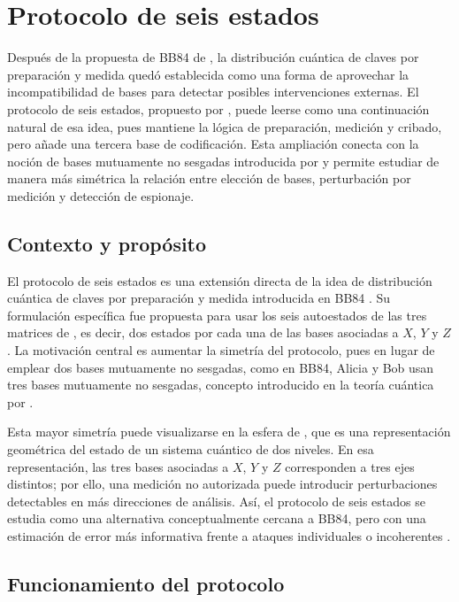 \section{Protocolo de seis estados}

Después de la propuesta de BB84 de \cite{bennett1984}, la distribución cuántica de claves por preparación y medida quedó establecida como una forma de aprovechar la incompatibilidad de bases para detectar posibles intervenciones externas. El protocolo de seis estados, propuesto por \cite{bruss1998}, puede leerse como una continuación natural de esa idea, pues mantiene la lógica de preparación, medición y cribado, pero añade una tercera base de codificación. Esta ampliación conecta con la noción de bases mutuamente no sesgadas introducida por \cite{schwinger1960} y permite estudiar de manera más simétrica la relación entre elección de bases, perturbación por medición y detección de espionaje.

\subsection{Contexto y propósito}

El protocolo de seis estados es una extensión directa de la idea de distribución cuántica de claves por preparación y medida introducida en BB84 \citep{bennett1984}. Su formulación específica fue propuesta para usar los seis autoestados de las tres matrices de \cite{pauli1927}, es decir, dos estados por cada una de las bases asociadas a $X$, $Y$ y $Z$ \citep{bruss1998}. La motivación central es aumentar la simetría del protocolo, pues en lugar de emplear dos bases mutuamente no sesgadas, como en BB84, Alicia y Bob usan tres bases mutuamente no sesgadas, concepto introducido en la teoría cuántica por \cite{schwinger1960}.

Esta mayor simetría puede visualizarse en la esfera de \cite{bloch1946}, que es una representación geométrica del estado de un sistema cuántico de dos niveles. En esa representación, las tres bases asociadas a $X$, $Y$ y $Z$ corresponden a tres ejes distintos; por ello, una medición no autorizada puede introducir perturbaciones detectables en más direcciones de análisis. Así, el protocolo de seis estados se estudia como una alternativa conceptualmente cercana a BB84, pero con una estimación de error más informativa frente a ataques individuales o incoherentes \citep{bruss1998,bechmann1999}.

\subsection{Funcionamiento del protocolo}

